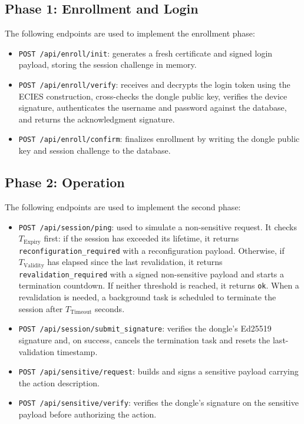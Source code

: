 \subsection{Phase 1: Enrollment and Login}
The following endpoints are used to implement the enrollment phase:
\begin{itemize}
    \item \texttt{POST /api/enroll/init}: generates a fresh certificate and signed login payload, storing the session challenge in memory.
    \item \texttt{POST /api/enroll/verify}: receives and decrypts the login token using the ECIES construction, cross-checks the dongle public key, verifies the device signature, authenticates the username and password against the database, and returns the acknowledgment signature.
    \item \texttt{POST /api/enroll/confirm}: finalizes enrollment by writing the dongle public key and session challenge to the database. 
\end{itemize}
\subsection{Phase 2: Operation}
The following endpoints are used to implement the second phase:
\begin{itemize}
    \item \texttt{POST /api/session/ping}: used to simulate a non-sensitive request. It checks $T_{\text{Expiry}}$ first: if the session has exceeded its lifetime, it returns \texttt{reconfiguration\_required} with a reconfiguration payload. Otherwise, if $T_{\text{Validity}}$ has elapsed since the last revalidation, it returns \texttt{revalidation\_required} with a signed non-sensitive payload and starts a termination countdown. If neither threshold is reached, it returns \texttt{ok}. When a revalidation is needed, a background task is scheduled to terminate the session after $T_{\text{Timeout}}$ seconds.
    \item \texttt{POST /api/session/submit\_signature}: verifies the dongle's Ed25519 signature and, on success, cancels the termination task and resets the last-validation timestamp.
    \item \texttt{POST /api/sensitive/request}: builds and signs a sensitive payload carrying the action description.
    \item \texttt{POST /api/sensitive/verify}: verifies the dongle's signature on the sensitive payload before authorizing the action.
\end{itemize}
